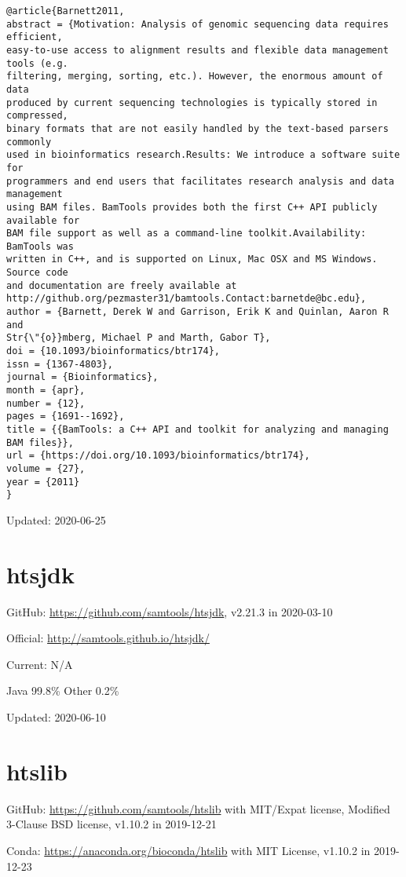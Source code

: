 \documentclass[]{article}
\begin{document}
\begin{verbatim}
@article{Barnett2011,
abstract = {Motivation: Analysis of genomic sequencing data requires efficient,
easy-to-use access to alignment results and flexible data management tools (e.g.
filtering, merging, sorting, etc.). However, the enormous amount of data
produced by current sequencing technologies is typically stored in compressed,
binary formats that are not easily handled by the text-based parsers commonly
used in bioinformatics research.Results: We introduce a software suite for
programmers and end users that facilitates research analysis and data management
using BAM files. BamTools provides both the first C++ API publicly available for
BAM file support as well as a command-line toolkit.Availability: BamTools was
written in C++, and is supported on Linux, Mac OSX and MS Windows. Source code
and documentation are freely available at
http://github.org/pezmaster31/bamtools.Contact:barnetde@bc.edu},
author = {Barnett, Derek W and Garrison, Erik K and Quinlan, Aaron R and
Str{\"{o}}mberg, Michael P and Marth, Gabor T},
doi = {10.1093/bioinformatics/btr174},
issn = {1367-4803},
journal = {Bioinformatics},
month = {apr},
number = {12},
pages = {1691--1692},
title = {{BamTools: a C++ API and toolkit for analyzing and managing BAM files}},
url = {https://doi.org/10.1093/bioinformatics/btr174},
volume = {27},
year = {2011}
}
\end{verbatim}

Updated: 2020-06-25

\section{htsjdk}

GitHub: \url{https://github.com/samtools/htsjdk}, v2.21.3 in 2020-03-10

Official: \url{http://samtools.github.io/htsjdk/}

Current: N/A

Java 99.8\% Other 0.2\% 

Updated: 2020-06-10
\section{htslib}

GitHub: \url{https://github.com/samtools/htslib} with MIT/Expat license, Modified 3-Clause BSD license, v1.10.2 in 2019-12-21 

Conda: \url{https://anaconda.org/bioconda/htslib} with MIT License, v1.10.2 in 2019-12-23
\end{document}
